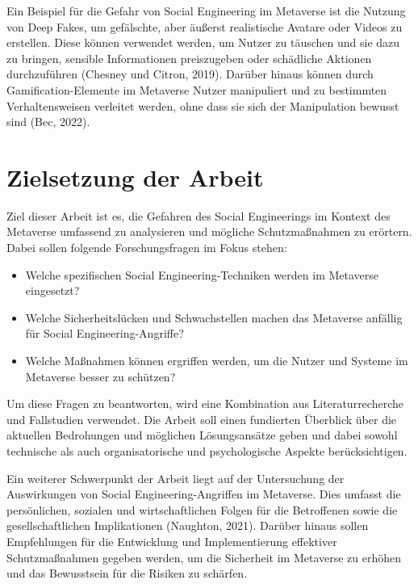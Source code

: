 Ein Beispiel für die Gefahr von Social Engineering im Metaverse ist die Nutzung von Deep Fakes, um gefälschte, aber äußerst realistische Avatare oder Videos zu erstellen. Diese können verwendet werden, um Nutzer zu täuschen und sie dazu zu bringen, sensible Informationen preiszugeben oder schädliche Aktionen durchzuführen (Chesney und Citron, 2019). Darüber hinaus können durch Gamification-Elemente im Metaverse Nutzer manipuliert und zu bestimmten Verhaltensweisen verleitet werden, ohne dass sie sich der Manipulation bewusst sind (Bec, 2022).

\section{Zielsetzung der Arbeit}

Ziel dieser Arbeit ist es, die Gefahren des Social Engineerings im Kontext des Metaverse umfassend zu analysieren und mögliche Schutzmaßnahmen zu erörtern. Dabei sollen folgende Forschungsfragen im Fokus stehen:


\begin{itemize}
\item Welche spezifischen Social Engineering-Techniken werden im Metaverse eingesetzt?
\item Welche Sicherheitslücken und Schwachstellen machen das Metaverse anfällig für Social Engineering-Angriffe?
\item Welche Maßnahmen können ergriffen werden, um die Nutzer und Systeme im Metaverse besser zu schützen?
\end{itemize}

Um diese Fragen zu beantworten, wird eine Kombination aus Literaturrecherche und Fallstudien verwendet. Die Arbeit soll einen fundierten Überblick über die aktuellen Bedrohungen und möglichen Lösungsansätze geben und dabei sowohl technische als auch organisatorische und psychologische Aspekte berücksichtigen.

Ein weiterer Schwerpunkt der Arbeit liegt auf der Untersuchung der Auswirkungen von Social Engineering-Angriffen im Metaverse. Dies umfasst die persönlichen, sozialen und wirtschaftlichen Folgen für die Betroffenen sowie die gesellschaftlichen Implikationen (Naughton, 2021). Darüber hinaus sollen Empfehlungen für die Entwicklung und Implementierung effektiver Schutzmaßnahmen gegeben werden, um die Sicherheit im Metaverse zu erhöhen und das Bewusstsein für die Risiken zu schärfen.